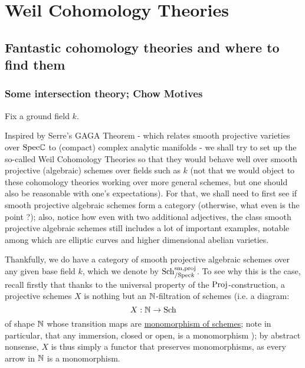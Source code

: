     \section{Weil Cohomology Theories}
        \subsection{Fantastic cohomology theories and where to find them}
            \subsubsection{Some intersection theory; Chow Motives}
                \begin{remark} \label{remark: categories_of_smooth_projective_schemes}
                    Fix a ground field $k$. 
                    
                    Inspired by Serre's GAGA Theorem - which relates smooth projective varieties over $\mathrm{Spec} \mathbb{C}$ to (compact) complex analytic manifolds - we shall try to set up the so-called Weil Cohomology Theories so that they would behave well over smooth projective (algebraic) schemes over fields such as $k$ (not that we would object to these cohomology theories working over more general schemes, but one should also be reasonable with one's expectations). For that, we shall need to first see if smooth projective algebraic schemes form a category (otherwise, what even is the point ?); also, notice how even with two additional adjectives, the class smooth projective algebraic schemes still includes a lot of important examples, notable among which are elliptic curves and higher dimensional abelian varieties.
                    
                    Thankfully, we do have a category of smooth projective algebraic schemes over any given base field $k$, which we denote by $\mathrm{Sch}_{/\mathrm{Spec} k}^{\mathrm{sm}, \mathrm{proj}}$. To see why this is the case, recall firstly that thanks to the universal property of the $\mathrm{Proj}$-construction, a projective schemes $X$ is nothing but an $\mathbb{N}$-filtration of schemes (i.e. a diagram:
                        $$X: \mathbb{N} \to \mathrm{Sch}$$
                    of shape $\mathbb{N}$ whose transition maps are \href{https://stacks.math.columbia.edu/tag/01L1}{\underline{monomorphism of schemes}}; note in particular, that any immersion, closed or open, is a monomorphism \cite[\href{https://stacks.math.columbia.edu/tag/01L7}{Tag 01L7}]{stacks}); by abstract nonsense, $X$ is thus simply a functor that preserves monomorphisms, as every arrow in $\mathbb{N}$ is a monomorphism.  
                \end{remark}
                
